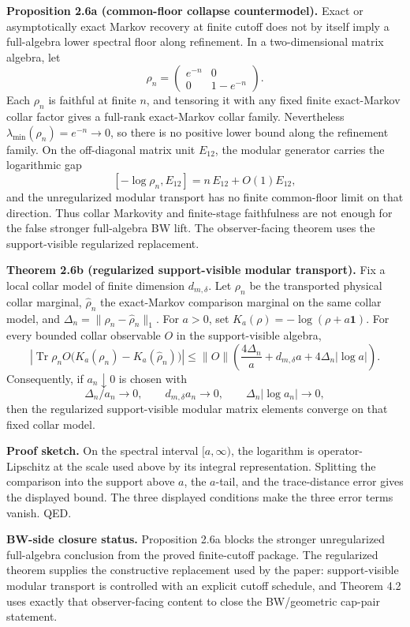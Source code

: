 \textbf{Proposition 2.6a (common-floor collapse countermodel).} Exact or asymptotically exact Markov recovery at finite cutoff does not by itself imply a full-algebra lower spectral floor along refinement. In a two-dimensional matrix algebra, let
\[
\rho_n=\begin{pmatrix}e^{-n}&0\\0&1-e^{-n}\end{pmatrix}.
\]
Each \(\rho_n\) is faithful at finite \(n\), and tensoring it with any fixed finite exact-Markov collar factor gives a full-rank exact-Markov collar family. Nevertheless \(\lambda_{\min}(\rho_n)=e^{-n}\to0\), so there is no positive lower bound along the refinement family. On the off-diagonal matrix unit \(E_{12}\), the modular generator carries the logarithmic gap
\[
[ -\log\rho_n, E_{12} ] = n\,E_{12}+O(1)E_{12},
\]
and the unregularized modular transport has no finite common-floor limit on that direction. Thus collar Markovity and finite-stage faithfulness are not enough for the false stronger full-algebra BW lift. The observer-facing theorem uses the support-visible regularized replacement.

\textbf{Theorem 2.6b (regularized support-visible modular transport).} Fix a local collar model of finite dimension \(d_{m,\delta}\). Let \(\rho_n\) be the transported physical collar marginal, \(\widehat\rho_n\) the exact-Markov comparison marginal on the same collar model, and \(\Delta_n=\|\rho_n-\widehat\rho_n\|_1\). For \(a>0\), set \(K_a(\rho)=-\log(\rho+a\mathbf 1)\). For every bounded collar observable \(O\) in the support-visible algebra,
\[
\left|\operatorname{Tr}\rho_n O\bigl(K_a(\rho_n)-K_a(\widehat\rho_n)\bigr)\right|
\le
\|O\|\left(
  \frac{4\Delta_n}{a}
  + d_{m,\delta}a
  +4\Delta_n|\log a|
\right).
\]
Consequently, if \(a_n\downarrow0\) is chosen with
\[
\Delta_n/a_n\to0,\qquad
d_{m,\delta}a_n\to0,\qquad
\Delta_n|\log a_n|\to0,
\]
then the regularized support-visible modular matrix elements converge on that fixed collar model.

\textbf{Proof sketch.} On the spectral interval \([a,\infty)\), the logarithm is operator-Lipschitz at the scale used above by its integral representation. Splitting the comparison into the support above \(a\), the \(a\)-tail, and the trace-distance error gives the displayed bound. The three displayed conditions make the three error terms vanish. QED.

\textbf{BW-side closure status.} Proposition 2.6a blocks the stronger unregularized full-algebra conclusion from the proved finite-cutoff package. The regularized theorem supplies the constructive replacement used by the paper: support-visible modular transport is controlled with an explicit cutoff schedule, and Theorem 4.2 uses exactly that observer-facing content to close the BW/geometric cap-pair statement.
